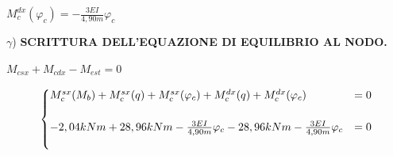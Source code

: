 \documentclass[a4paper,12pt, oneside]{book}
\newenvironment{tightcenter}{%
	\setlength\topsep{0pt}
	\setlength\parskip{0pt}
	\begin{center}
	}{%
	\end{center}
}
\begin{document}
    \begin{tightcenter}
    $M_{c}^{dx}(\varphi_{c})=-\frac{3EI}{4,90m}\varphi_{c}$
    \end{tightcenter}
    \leavevmode\newline
    \leavevmode\newline
    \leavevmode\newline
    $\gamma$) \textbf{SCRITTURA DELL'EQUAZIONE DI EQUILIBRIO AL NODO.} 
    \leavevmode\newline
    \leavevmode\newline
    \begin{tightcenter}
      $ M_{csx}+M_{cdx}-M_{est}=0  $
    \end{tightcenter}
    \leavevmode\newline 
    \begin{equation}
    	\begin{cases}
    		M_{c}^{sx}(M_b)+M_{c}^{sx}(q)+M_{c}^{sx}(\varphi_{c})+M_{c}^{dx}(q)+M_{c}^{dx}(\varphi_{c})&=0 \\ \\
    		-2,04kNm+28,96kNm-\frac{3EI}{4,90m}\varphi_{c}-28,96kNm-\frac{3EI}{4,90m}\varphi_{c}&=0\\ \\ 
    	\end{cases}
    	\hfill
    \end{equation}
 
\end{document}
